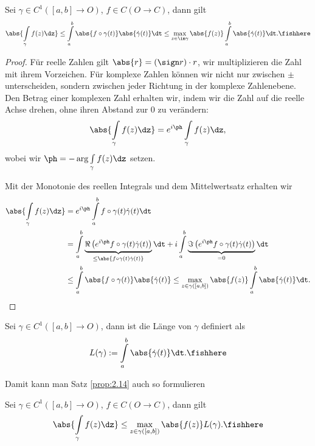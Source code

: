 \begin{prop}
\label{prop:2.14}
Sei $\gamma\in C^1([a,b]\to O)$, $f\in C(O\to C)$, dann gilt
\begin{align*}
\abs{\int\limits_\gamma f(z) \dz} \le \int\limits_a^b \abs{f\circ
\gamma(t)}\abs{\dot{\gamma}(t)}\dt \le \max\limits_{z\in\im\gamma}
\abs{f(z)} \int\limits_a^b \abs{\dot{\gamma}(t)}\dt.\fishhere
\end{align*}
\end{prop}
\begin{proof}
Für reelle Zahlen gilt $\abs{r} = (\sign r)\cdot r$, wir multiplizieren die
Zahl mit ihrem Vorzeichen. Für komplexe Zahlen können wir nicht nur
zwischen $\pm$ unterscheiden, sondern zwischen jeder Richtung in der komplexe
Zahlenebene. Den Betrag einer komplexen Zahl erhalten wir, indem wir die Zahl
auf die reelle Achse drehen, ohne ihren Abstand zur $0$ zu verändern:
\begin{align*}
\abs{\int\limits_\gamma f(z) \dz} = e^{i\ph}\int\limits_\gamma f(z) \dz,
\end{align*}
wobei wir $\ph = - \arg \int\limits_\gamma f(z) \dz$ setzen.

Mit der Monotonie des reellen Integrals und dem Mittelwertsatz erhalten wir
\begin{align*}
\abs{\int\limits_\gamma f(z) \dz} &= e^{i\ph}\int\limits_a^b f\circ\gamma(t)
\dot{\gamma}(t) \dt \\ &= \int\limits_a^b \underbrace{\Re\left(e^{i\ph}
f\circ\gamma(t)
\dot{\gamma}(t) \right)}_{\le \abs{f\circ\gamma(t)\dot{\gamma}(t)}}
 \dt + i\int\limits_a^b \underbrace{\Im  \left(e^{i\ph}
f\circ\gamma(t) \dot{\gamma}(t) \right)}_{=0} \dt
\\ &\le \int\limits_a^b \abs{f\circ\gamma(t)}\abs{\dot{\gamma}(t)}
\le \max\limits_{z\in\gamma([a,b])} \abs{f(z)}  \int\limits_a^b
\abs{\dot{\gamma}(t)} \dt.\qedhere
\end{align*}
\end{proof}

\begin{defn}
\label{defn:2.15}
Sei $\gamma\in C^1([a,b]\to O)$, dann ist die Länge von $\gamma$ definiert als
\begin{align*}
L(\gamma) := \int\limits_a^b \abs{\dot{\gamma}(t)}\dt.\fishhere
\end{align*}
\end{defn}

Damit kann man Satz \ref{prop:2.14} auch so formulieren
\begin{propn}
Sei $\gamma\in C^1([a,b]\to O)$, $f\in C(O\to C)$, dann gilt
\begin{align*}
\abs{\int\limits_\gamma f(z) \dz} \le \max\limits_{z\in \gamma([a,b])}
\abs{f(z)} L(\gamma).\fishhere
\end{align*}
\end{propn}

